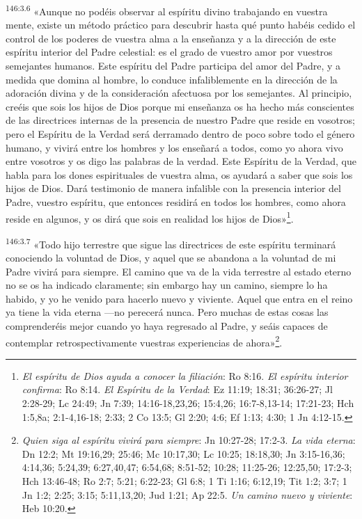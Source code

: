 \par
\textsuperscript{146:3.6} «Aunque no podéis observar al espíritu divino trabajando en vuestra mente, existe un método práctico para descubrir hasta qué punto habéis cedido el control de los poderes de vuestra alma a la enseñanza y a la dirección de este espíritu interior del Padre celestial: es el grado de vuestro amor por vuestros semejantes humanos. Este espíritu del Padre participa del amor del Padre, y a medida que domina al hombre, lo conduce infaliblemente en la dirección de la adoración divina y de la consideración afectuosa por los semejantes. Al principio, creéis que sois los hijos de Dios porque mi enseñanza os ha hecho más conscientes de las directrices internas de la presencia de nuestro Padre que reside en vosotros; pero el Espíritu de la Verdad será derramado dentro de poco sobre todo el género humano, y vivirá entre los hombres y los enseñará a todos, como yo ahora vivo entre vosotros y os digo las palabras de la verdad. Este Espíritu de la Verdad, que habla para los dones espirituales de vuestra alma, os ayudará a saber que sois los hijos de Dios. Dará testimonio de manera infalible con la presencia interior del Padre, vuestro espíritu, que entonces residirá en todos los hombres, como ahora reside en algunos, y os dirá que sois en realidad los hijos de Dios»\footnote{\textit{El espíritu de Dios ayuda a conocer la filiación}: Ro 8:16. \textit{El espíritu interior confirma}: Ro 8:14. \textit{El Espíritu de la Verdad}: Ez 11:19; 18:31; 36:26-27; Jl 2:28-29; Lc 24:49; Jn 7:39; 14:16-18,23,26; 15:4,26; 16:7-8,13-14; 17:21-23; Hch 1:5,8a; 2:1-4,16-18; 2:33; 2 Co 13:5; Gl 2:20; 4:6; Ef 1:13; 4:30; 1 Jn 4:12-15.}.

\par
\textsuperscript{146:3.7} «Todo hijo terrestre que sigue las directrices de este espíritu terminará conociendo la voluntad de Dios, y aquel que se abandona a la voluntad de mi Padre vivirá para siempre. El camino que va de la vida terrestre al estado eterno no se os ha indicado claramente; sin embargo hay un camino, siempre lo ha habido, y yo he venido para hacerlo nuevo y viviente. Aquel que entra en el reino ya tiene la vida eterna ---no perecerá nunca. Pero muchas de estas cosas las comprenderéis mejor cuando yo haya regresado al Padre, y seáis capaces de contemplar retrospectivamente vuestras experiencias de ahora»\footnote{\textit{Quien siga al espíritu vivirá para siempre}: Jn 10:27-28; 17:2-3. \textit{La vida eterna}: Dn 12:2; Mt 19:16,29; 25:46; Mc 10:17,30; Lc 10:25; 18:18,30; Jn 3:15-16,36; 4:14,36; 5:24,39; 6:27,40,47; 6:54,68; 8:51-52; 10:28; 11:25-26; 12:25,50; 17:2-3; Hch 13:46-48; Ro 2:7; 5:21; 6:22-23; Gl 6:8; 1 Ti 1:16; 6:12,19; Tit 1:2; 3:7; 1 Jn 1:2; 2:25; 3:15; 5:11,13,20; Jud 1:21; Ap 22:5. \textit{Un camino nuevo y viviente}: Heb 10:20.}.

